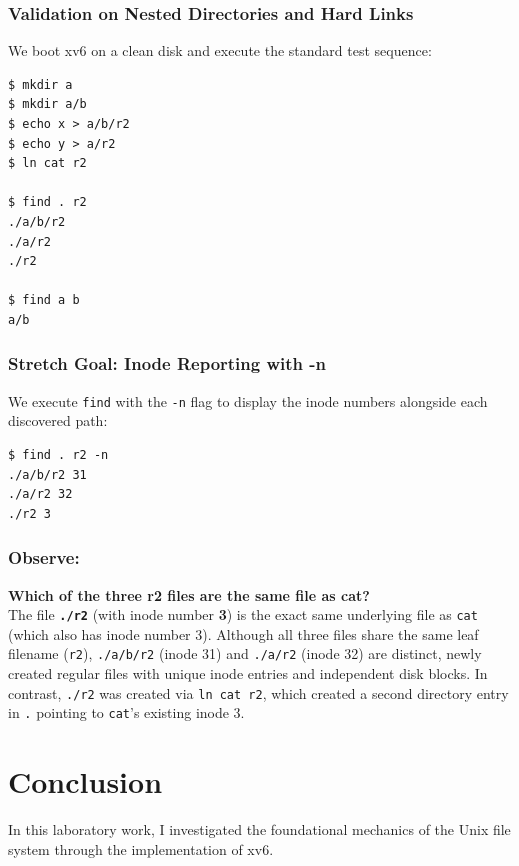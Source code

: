 \documentclass{labreport}
\begin{document}
\subsubsection{Validation on Nested Directories and Hard Links}
We boot xv6 on a clean disk and execute the standard test sequence:

\begin{lstlisting}[style=bash]
$ mkdir a
$ mkdir a/b
$ echo x > a/b/r2
$ echo y > a/r2
$ ln cat r2

$ find . r2
./a/b/r2
./a/r2
./r2

$ find a b
a/b
\end{lstlisting}

\subsubsection*{Stretch Goal: Inode Reporting with -n}
We execute \texttt{find} with the \texttt{-n} flag to display the inode numbers alongside each discovered path:

\begin{lstlisting}[style=bash]
$ find . r2 -n
./a/b/r2 31
./a/r2 32
./r2 3
\end{lstlisting}

\subsubsection*{Observe:}
\textbf{Which of the three r2 files are the same file as cat?}\\[0.2em]
The file \textbf{\texttt{./r2}} (with inode number \textbf{3}) is the exact same underlying file as \texttt{cat} (which also has inode number 3). Although all three files share the same leaf filename (\texttt{r2}), \texttt{./a/b/r2} (inode 31) and \texttt{./a/r2} (inode 32) are distinct, newly created regular files with unique inode entries and independent disk blocks. In contrast, \texttt{./r2} was created via \texttt{ln cat r2}, which created a second directory entry in \texttt{.} pointing to \texttt{cat}'s existing inode 3.

\section{Conclusion}

In this laboratory work, I investigated the foundational mechanics of the Unix file system through the implementation of xv6.
\end{document}
